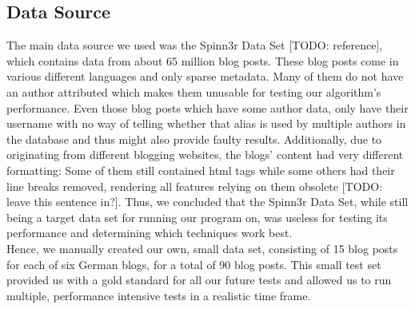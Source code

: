 \subsection{Data Source}
\label{sec:data_source}

The main data source we used was the Spinn3r Data Set [TODO: reference], which contains data from about 65 million blog posts.
These blog posts come in various different languages and only sparse metadata.
Many of them do not have an author attributed which makes them unusable for testing our algorithm's performance.
Even those blog posts which have some author data, only have their username with no way of telling whether that alias is used by multiple authors in the database and thus might also provide faulty results.
Additionally, due to originating from different blogging websites, the blogs' content had very different formatting: Some of them still contained html tags while some others had their line breaks removed, rendering all features relying on them obsolete [TODO: leave this sentence in?].
Thus, we concluded that the Spinn3r Data Set, while still being a target data set for running our program on, was useless for testing its performance and determining which techniques work best.
\\
Hence, we manually created our own, small data set, consisting of 15 blog posts for each of six German blogs, for a total of 90 blog posts.
This small test set provided us with a gold standard for all our future tests and allowed us to run multiple, performance intensive tests in a realistic time frame.
